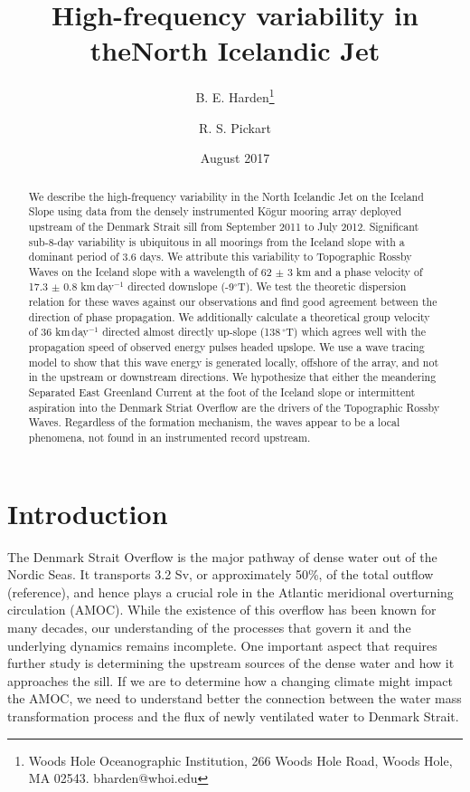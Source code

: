 \documentclass[12pt,titlepage,figuresatend]{article}
\title{High-frequency variability in the\authorcr North Icelandic Jet}
\author{B. E. Harden\footnote{Woods Hole Oceanographic Institution, 266 Woods Hole Road, Woods Hole, MA 02543. bharden@whoi.edu}}
\author{R. S. Pickart}
\affil{Woods Hole Oceanographic Institution, Woods Hole, USA}
\date{August 2017}
\begin{document}
\maketitle

\begin{abstract}
We describe the high-frequency variability in the North Icelandic Jet on the Iceland Slope using data from the densely instrumented K\"{o}gur mooring array deployed upstream of the Denmark Strait sill from September 2011 to July 2012. Significant sub-8-day variability is ubiquitous in all moorings from the Iceland slope with a dominant period of 3.6 days. We attribute this variability to Topographic Rossby Waves on the Iceland slope with a wavelength of 62 $\pm$ 3 km and a phase velocity of 17.3 $\pm$ 0.8 km$\,$day$^{-1}$ directed downslope (-9$^{\circ}$T). We test the theoretic dispersion relation for these waves against our observations and find good agreement between the direction of phase propagation. We additionally calculate a theoretical group velocity of 36 km$\,$day$^{-1}$ directed almost directly up-slope (138$\,^{\circ}$T) which agrees well with the propagation speed of observed energy pulses headed upslope. We use a wave tracing model to show that this wave energy is generated locally, offshore of the array, and not in the upstream or downstream directions. We hypothesize that either the meandering Separated East Greenland Current at the foot of the Iceland slope or intermittent aspiration into the Denmark Striat Overflow are the drivers of the Topographic Rossby Waves. Regardless of the formation mechanism, the waves appear to be a local phenomena, not found in an instrumented record upstream.

\end{abstract}

\section{Introduction}

The Denmark Strait Overflow is the major pathway of dense water out of the Nordic Seas. It transports 3.2 Sv, or approximately 50\%, of the total outflow (reference), and hence plays a crucial role in the Atlantic meridional overturning circulation (AMOC). While the existence of this overflow has been known for many decades, our understanding of the processes that govern it and the underlying dynamics remains incomplete. One important aspect that requires further study is determining the upstream sources of the dense water and how it approaches the sill. If we are to determine how a changing climate might impact the AMOC, we need to understand better the connection between the water mass transformation process and the flux of newly ventilated water to Denmark Strait. 
\end{document}
